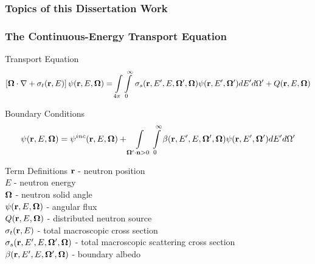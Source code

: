 \documentclass[compress,10pt]{beamer}
\renewcommand{\vec}[1]{\mathbf{#1}}
\begin{document}
\begin{frame}[t]\frametitle{Topics of this Dissertation Work}

\end{frame}
\begin{frame}[t]\frametitle{The Continuous-Energy Transport Equation} \vspace{-2.5mm}
\begin{block}{Transport Equation}{\footnotesize
\begin{equation*}
\left[ { \bf \Omega} \cdot {\bf \nabla}  + \sigma_t ({\bf r}, E) \right] \psi ({\bf r}, E, {\bf \Omega}) = \int\displaylimits_{4 \pi} \int\displaylimits_{0}^{\infty}  \, \sigma_s ({\bf r}, E' , E, {\bf \Omega}' , {\bf \Omega}) \psi ({\bf r}, E', {\bf \Omega}') d E'  d \Omega'+ Q ({\bf r}, E, {\bf \Omega})
\end{equation*}
}\end{block} \vspace{-1.0mm}
\begin{block}{Boundary Conditions}{\footnotesize
\begin{equation*}
\psi ({\bf r}, E, {\bf \Omega}) = \psi^{inc} ({\bf r}, E, {\bf \Omega}) +  \int\displaylimits_{\vec{\Omega}' \cdot \vec{n} > 0} \int\displaylimits_{0}^{\infty} \beta ({\bf r}, E' , E, {\bf \Omega}' , {\bf \Omega}) \psi ({\bf r}, E', {\bf \Omega}') d E'  d \Omega'
\end{equation*}
}\end{block} \vspace{-1.0mm}
\begin{block}{Term Definitions} {\footnotesize
${\bf r}$ -  neutron position \\
$E$ -  neutron energy \\
${\bf \Omega}$ - neutron solid angle \\
$\psi  ({\bf r}, E, {\bf \Omega})$ - angular flux  \\
$Q  ({\bf r}, E, {\bf \Omega})$ - distributed neutron source \\
$\sigma_t ({\bf r}, E)$ - total macroscopic cross section \\
$\sigma_s ({\bf r}, E' , E, {\bf \Omega}' , {\bf \Omega})$ - total macroscopic scattering cross section\\
$\beta ({\bf r}, E' , E, {\bf \Omega}' , {\bf \Omega})$ - boundary albedo 
}\end{block}
\end{frame}
\end{document}
